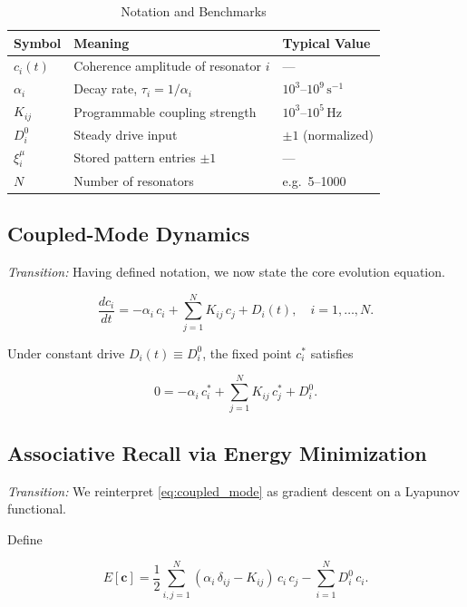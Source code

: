 \begin{table}[ht]
  \centering
  \caption{Notation and Benchmarks}
  \label{tab:notation}
  \begin{tabular}{@{}lll@{}}
    \toprule
    Symbol & Meaning & Typical Value \\
    \midrule
    $c_i(t)$      & Coherence amplitude of resonator $i$ & — \\
    $\alpha_i$    & Decay rate, $\tau_i=1/\alpha_i$ & $10^{3}$–$10^{9}\,\mathrm s^{-1}$ \\
    $K_{ij}$      & Programmable coupling strength & $10^{3}$–$10^{5}\,\mathrm{Hz}$ \\
    $D_i^0$       & Steady drive input               & $\pm1$ (normalized) \\
    $\xi_i^\mu$   & Stored pattern entries $\pm1$      & — \\
    $N$           & Number of resonators            & e.g.\ 5–1000 \\
    \bottomrule
  \end{tabular}
\end{table}

\subsection{Coupled-Mode Dynamics}
\emph{Transition:} Having defined notation, we now state the core evolution equation.

\begin{equation}\label{eq:coupled_mode}
\frac{dc_i}{dt} = -\alpha_i\,c_i + \sum_{j=1}^{N}K_{ij}\,c_j + D_i(t),
\quad i=1,\dots,N.
\end{equation}

Under constant drive $D_i(t)\equiv D_i^0$, the fixed point $c_i^*$ satisfies

\begin{equation}\label{eq:fixed_point}
0 = -\alpha_i\,c_i^* + \sum_{j=1}^N K_{ij}\,c_j^* + D_i^0.
\end{equation}

\subsection{Associative Recall via Energy Minimization}
\emph{Transition:} We reinterpret \eqref{eq:coupled_mode} as gradient descent on a Lyapunov functional.

Define

\begin{equation}\label{eq:energy}
E[\mathbf{c}]
= \frac12\sum_{i,j=1}^N(\alpha_i\,\delta_{ij} - K_{ij})\,c_i\,c_j
- \sum_{i=1}^N D_i^0\,c_i.
\end{equation}

